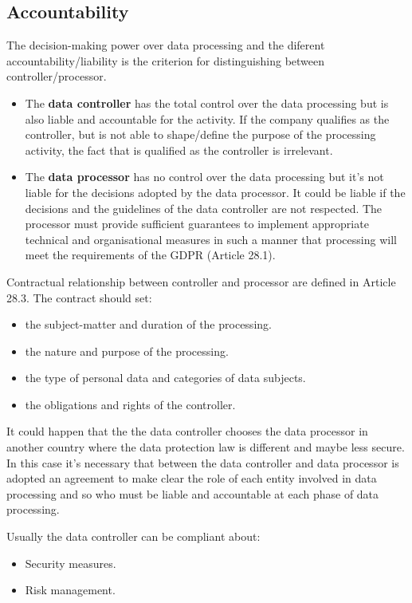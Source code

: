 \subsection{Accountability}
The decision-making power over data processing and the diferent accountability/liability is the criterion for distinguishing between controller/processor. 
\begin{itemize}
    \item The \textbf{data controller} has the total control over the data processing but is also liable and accountable for the activity. If the company qualifies as the controller, but is not able to shape/define the purpose of the processing activity, the fact that is qualified as the controller is irrelevant.
    \item The \textbf{data processor} has no control over the data processing but it's not liable for the decisions adopted by the data processor. It could be liable if the decisions and the guidelines of the data controller are not respected. The processor must provide sufficient guarantees to implement appropriate technical and organisational measures in such a manner that processing will meet the requirements of the GDPR (Article 28.1).
\end{itemize}
Contractual relationship between controller and processor are defined in Article 28.3. The contract should set:
\begin{itemize}
    \item the subject-matter and duration of the processing.
    \item the nature and purpose of the processing.
    \item the type of personal data and categories of data subjects.
    \item the obligations and rights of the controller.
\end{itemize}
It could happen that the the data controller chooses the data processor in another country where the data protection law is different and maybe less secure. In this case it's necessary that between the data controller and data processor is adopted an agreement to make clear the role of each entity involved in data processing and so who must be liable and accountable at each phase of data processing.

Usually the data controller can be compliant about:
\begin{itemize}
    \item Security measures.
    \item Risk management.
\end{itemize}

